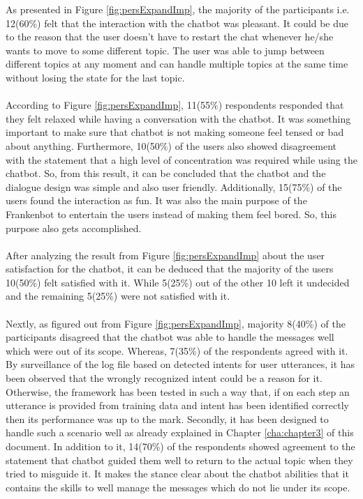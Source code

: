 \noindent
As presented in Figure \ref{fig:persExpandImp}, the majority of the participants i.e. 12(60\%) felt that the interaction with the chatbot was pleasant. It could be due to the reason that the user doesn't have to restart the chat whenever he/she wants to move to some different topic. The user was able to jump between different topics at any moment and can handle multiple topics at the same time without losing the state for the last topic. 
\\~\\
According to Figure \ref{fig:persExpandImp}, 11(55\%) respondents responded that they felt relaxed while having a conversation with the chatbot. It was something important to make sure that chatbot is not making someone feel tensed or bad about anything. Furthermore, 10(50\%) of the users also showed disagreement with the statement that a high level of concentration was required while using the chatbot. So, from this result, it can be concluded that the chatbot and the dialogue design was simple and also user friendly. Additionally, 15(75\%) of the users found the interaction as fun. It was also the main purpose of the Frankenbot to entertain the users instead of making them feel bored. So, this purpose also gets accomplished. 
\\~\\
After analyzing the result from Figure \ref{fig:persExpandImp} about the user satisfaction for the chatbot, it can be deduced that the majority of the users 10(50\%) felt satisfied with it. While 5(25\%) out of the other 10 left it undecided and the remaining 5(25\%) were not satisfied with it.
\\~\\
Nextly, as figured out from Figure \ref{fig:persExpandImp}, majority 8(40\%) of the participants disagreed that the chatbot was able to handle the messages well which were out of its scope. Whereas, 7(35\%) of the respondents agreed with it. By surveillance of the log file based on detected intents for user utterances, it has been observed that the wrongly recognized intent could be a reason for it. Otherwise, the framework has been tested in such a way that, if on each step an utterance is provided from training data and intent has been identified correctly then its performance was up to the mark. Secondly, it has been designed to handle such a scenario well as already explained in Chapter \ref{cha:chapter3} of this document. In addition to it, 14(70\%) of the respondents showed agreement to the statement that chatbot guided them well to return to the actual topic when they tried to misguide it. It makes the stance clear about the chatbot abilities that it contains the skills to well manage the messages which do not lie under its scope.
